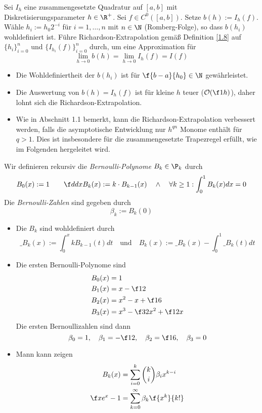 \documentclass[11pt]{scrbook}
\begin{document}
\begin{df}
	\label{2.33}
	Sei $I_h$ eine zusammengesetzte Quadratur auf $[a,b]$ mit Diskretisierungsparameter $h\in \R^+$.
	Sei $f\in C^0([a,b])$.
	Setze $b(h) := I_h(f)$.
	Wähle $h_i := h_0 2^{-i}$ für $i=1,\dotsc,n$ mit $n\in \N$ (Romberg-Folge), so dass $b(h_i)$ wohldefiniert ist.
	Führe Richardson-Extrapolation gemäß Definition \ref{1.8} auf $\{h_i\}_{i=0}^n$ und $\{I_{h_i}(f)\}_{i=0}^n$ durch, um eine Approximation für
	\[
		\lim_{h\to 0} b(h) = \lim_{h\to 0} I_h(f) = I(f)
	\]
	\begin{note}
		\begin{itemize}
			\item
				Die Wohldefiniertheit der $b(h_i)$ ist für $\f{b-a}{h_0} \in \N$ gewährleistet.
			\item
				Die Auswertung von $b(h) = I_h(f)$ ist für kleine $h$ teuer ($\mathcal O(\f 1h)$), daher lohnt sich die Richardson-Extrapolation.
			\item
				Wie in Abschnitt 1.1 bemerkt, kann die Richardson-Extrapolation verbessert werden, falls die asymptotische Entwicklung nur $h^{qn}$ Monome enthält für $q>1$.
				Dies ist insbesondere für die zusammengesetzte Trapezregel erfüllt, wie im Folgenden hergeleitet wird.
		\end{itemize}
	\end{note}
\end{df}

\begin{df}
	\label{2.34}
	Wir definieren rekursiv die \emph{Bernoulli-Polynome} $B_k \in \P_k$ durch
	\[
		B_0(x) := 1 \qquad
		\f d{dx} B_k(x) := k \cdot B_{k-1}(x) \quad \land \quad \forall k\ge 1 : \int_0^1 B_k(x) dx = 0
	\]
	Die \emph{Bernoulli-Zahlen} sind gegeben durch
	\[
		\beta_k := B_k(0)
	\]
	\begin{note}
		\begin{itemize}
			\item
				Die $B_k$ sind wohldefiniert durch
				\[
					\_{B_k}(x) := \int_0^x k B_{k-1}(t) dt 
					\quad \text{und} \quad
					B_k(x) := \_{B_k}(x) - \int_0^1 \_{B_k}(t) dt
				\]
			\item
				Die ersten Bernoulli-Polynome sind
				\begin{align*}
					B_0(x) &= 1  \\
					B_1(x) &= x - \f 12 \\
					B_2(x) &= x^2 - x + \f 16 \\
					B_3(x) &= x^3 - \f 32 x^2 + \f 12 x
				\end{align*}
				Die ersten Bernoullizahlen sind dann
				\[
					\beta_0 = 1, \quad
					\beta_1 = -\f 12, \quad
					\beta_2 = \f 16, \quad
					\beta_3 = 0
				\]
			\item
				Mann kann zeigen
				\begin{align*}
					B_k(x) &= \sum_{i=0}^k \binom ki \beta_i x^{k-i} \\
					\f x{e^x - 1} &= \sum_{k=0}^\infty \beta_k \f {x^k}{k!}
				\end{align*}
		\end{itemize}
	\end{note}
\end{df}
\end{document}
